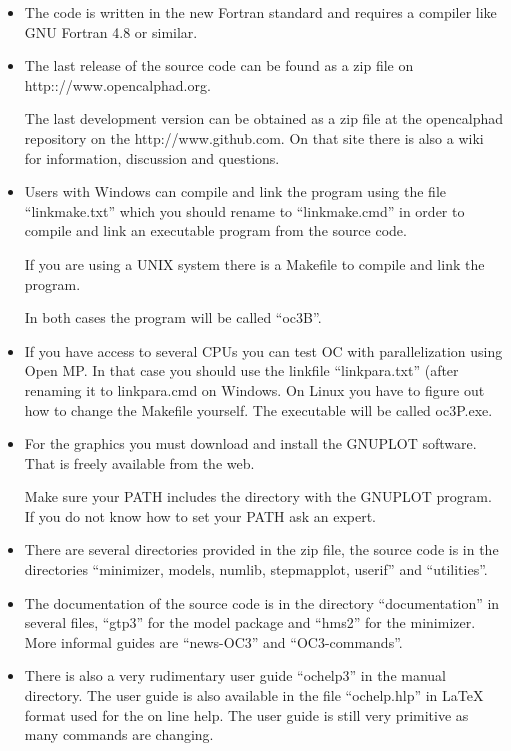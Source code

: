\documentclass[12pt]{article}
\begin{document}
\begin{itemize}
\item The code is written in the new Fortran standard and requires a
  compiler like GNU Fortran 4.8 or similar.

\item The last release of the source code can be found as a zip file
  on http:://www.opencalphad.org.

  The last development version can be obtained as a zip file at the
  opencalphad repository on the http://www.github.com.  On that site
  there is also a wiki for information, discussion and questions.

\item Users with Windows can compile and link the program using the
  file ``linkmake.txt'' which you should rename to ``linkmake.cmd'' in
  order to compile and link an executable program from the source
  code.

  If you are using a UNIX system there is a Makefile to compile and link
  the program.

  In both cases the program will be called ``oc3B''.

\item If you have access to several CPUs you can test OC with
  parallelization using Open MP.  In that case you should use the
  linkfile ``linkpara.txt'' (after renaming it to linkpara.cmd on
  Windows.  On Linux you have to figure out how to change the Makefile
  yourself.  The executable will be called oc3P.exe.

\item For the graphics you must download and install the GNUPLOT
  software.  That is freely available from the web.

  Make sure your PATH includes the directory with the GNUPLOT program.
  If you do not know how to set your PATH ask an expert.

\item There are several directories provided in the zip file, the
  source code is in the directories ``minimizer, models, numlib,
  stepmapplot, userif'' and ``utilities''.

\item The documentation of the source code is in the directory
  ``documentation'' in several files, ``gtp3'' for the model package
  and ``hms2'' for the minimizer.  More informal guides are
  ``news-OC3'' and ``OC3-commands''.

\item There is also a very rudimentary user guide ``ochelp3'' in the
  manual directory.  The user guide is also available in the file
  ``ochelp.hlp'' in LaTeX format used for the on line help.  The user
  guide is still very primitive as many commands are changing.


\end{itemize}
\end{document}
